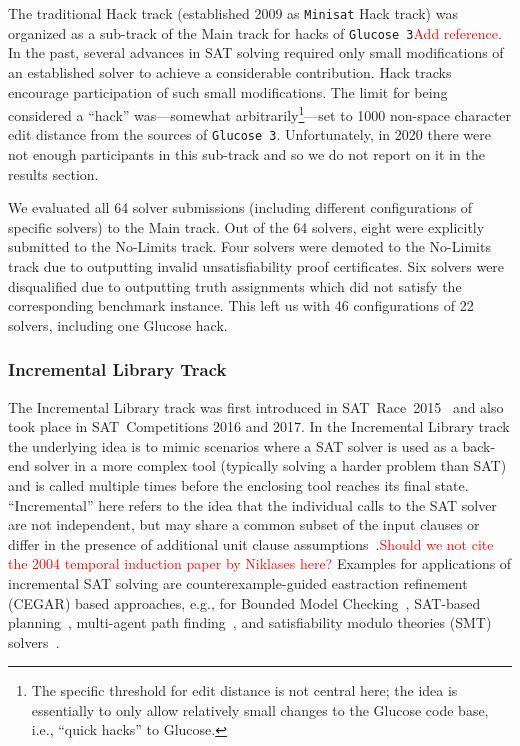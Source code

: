 \documentclass{elsarticle}
\newcommand{\solver}[1]{\texttt{#1}}
\begin{document}
The traditional Hack track (established 
2009 as \solver{Minisat} Hack track) was organized as a sub-track of the Main track for hacks of \solver{Glucose 3}\textcolor{red}{Add reference}. 
In the past, several advances in SAT solving required only small modifications of an established solver to achieve a considerable contribution. 
Hack tracks encourage participation of such small modifications. 
The limit for being considered a ``hack'' was---somewhat arbitrarily\footnote{The specific threshold for edit distance is not central here; the idea is essentially to only allow relatively small changes to the Glucose
code base, i.e., ``quick hacks'' to Glucose.}---set to 1000 non-space character edit distance from the sources of \solver{Glucose 3}. 
Unfortunately, in 2020 there were not enough participants in this sub-track and so we do not report on it in the results section.

We evaluated all 64 solver submissions (including different configurations of specific solvers) 
to the Main track. Out of the 64 solvers, eight were explicitly submitted to the No-Limits track. Four solvers
 were demoted to the No-Limits track due to outputting invalid unsatisfiability proof certificates. 
Six solvers were disqualified due to outputting truth assignments which did not satisfy the corresponding benchmark instance.
This left us with 46 configurations of 22 solvers, including %
one Glucose hack.


\subsubsection{Incremental Library Track}

The Incremental Library track was first introduced in SAT~Race~2015~\cite{Balyo:2015:SATRace} and also took place in SAT~Competitions 2016 and 2017.
In the Incremental Library track the underlying idea is to mimic scenarios
where a SAT solver is used as a back-end solver in a more complex tool
(typically solving a harder problem than SAT) and is called multiple times before 
the enclosing tool reaches its final state. 
``Incremental'' here refers to the idea that the individual calls to the SAT solver are not independent, but may share a common subset of the input clauses or differ in the presence of additional unit clause assumptions~\cite{Nadel:2014:Incremental,Fazekas:2019:IncrementalInprocessing}.\textcolor{red}{Should we not cite the 2004 temporal induction paper by Niklases here?}
Examples for applications of incremental SAT solving are counterexample-guided eastraction refinement (CEGAR) based approaches, e.g., for Bounded Model Checking~\cite{Strichman:2005:ARBMC}, SAT-based planning~\cite{Balyo:2017:IncrPlanning},
multi-agent path finding~\cite{DBLP:conf/ijcai/Surynek19}, and satisfiability modulo theories (SMT) solvers~\cite{Brummayer:2009:Boolector}. 
\end{document}
